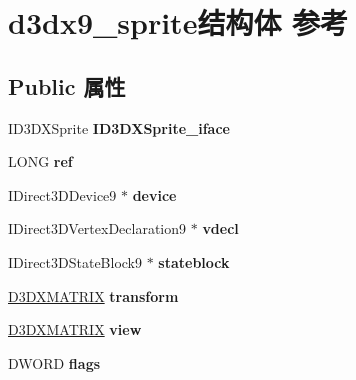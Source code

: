 \hypertarget{structd3dx9__sprite}{}\section{d3dx9\+\_\+sprite结构体 参考}
\label{structd3dx9__sprite}
\subsection*{Public 属性}
\begin{DoxyCompactItemize}
\item 
\mbox{\label{structd3dx9__sprite_af911e77d5bbf221ea00bbb574da2a160}} 
I\+D3\+D\+X\+Sprite {\bfseries I\+D3\+D\+X\+Sprite\+\_\+iface}
\item 
\mbox{\label{structd3dx9__sprite_ae7bc788e4a6a5a143e8404f99314dbb2}} 
L\+O\+NG {\bfseries ref}
\item 
\mbox{\label{structd3dx9__sprite_a69773f01da49caeaacae2134041bc15a}} 
I\+Direct3\+D\+Device9 $\ast$ {\bfseries device}
\item 
\mbox{\label{structd3dx9__sprite_ae76775ca3c8b91e3f922c12cddf040b3}} 
I\+Direct3\+D\+Vertex\+Declaration9 $\ast$ {\bfseries vdecl}
\item 
\mbox{\label{structd3dx9__sprite_a7b8e545376d629cabf0acc8b2cb79c91}} 
I\+Direct3\+D\+State\+Block9 $\ast$ {\bfseries stateblock}
\item 
\mbox{\label{structd3dx9__sprite_a7f92a3beab9c6057043590c4511e56d8}} 
\hyperlink{struct___d3_d_m_a_t_r_i_x}{D3\+D\+X\+M\+A\+T\+R\+IX} {\bfseries transform}
\item 
\mbox{\label{structd3dx9__sprite_ae929868260441c8a45b8fe5f507bc085}} 
\hyperlink{struct___d3_d_m_a_t_r_i_x}{D3\+D\+X\+M\+A\+T\+R\+IX} {\bfseries view}
\item 
\mbox{\label{structd3dx9__sprite_abfcdfd3d8d22975003c2e06edf82a0f1}} 
D\+W\+O\+RD {\bfseries flags}
\item 
\mbox{\label{structd3dx9__sprite_a974f81268a180fdea1e1deba3e3fec00}} 

\end{DoxyCompactItemize}

